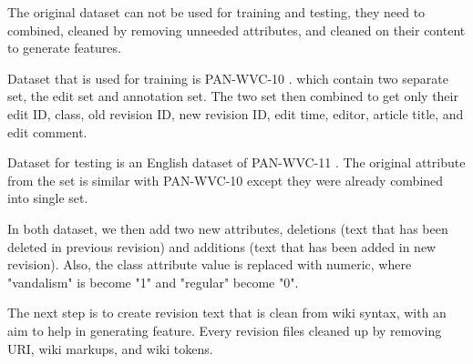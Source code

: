 The original dataset can not be used for training and testing, they need to
combined, cleaned by removing unneeded attributes, and cleaned on their content
to generate features.

Dataset that is used for training is PAN-WVC-10 \cite{potthast2008automatic}.
which contain two separate set, the edit set and annotation set.
The two set then combined to get only their edit ID, class, old revision ID,
new revision ID, edit time, editor, article title, and edit comment.

Dataset for testing is an English dataset of PAN-WVC-11 \cite{potthast:2010b}.
The original attribute from the set is similar with PAN-WVC-10 except they were
already combined into single set.

In both dataset, we then add two new attributes, deletions
(text that has been deleted in previous revision) and additions (text that
has been added in new revision).
Also, the class attribute value is replaced with numeric, where
"vandalism" is become "1" and "regular" become "0".

The next step is to create revision text that is clean from wiki syntax, with
an aim to help in generating feature.
Every revision files cleaned up by removing URI, wiki markups, and wiki tokens.
